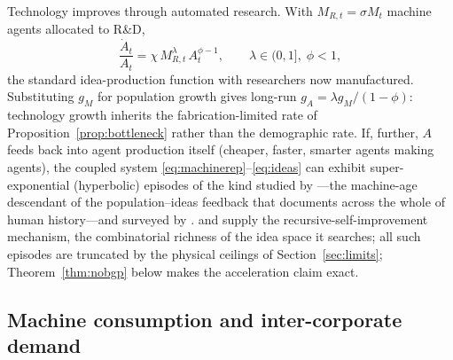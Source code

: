 \documentclass[11pt]{article}
\begin{document}
Technology improves through automated research. With $M_{R,t} = \sigma M_t$ machine agents allocated to R\&D,
\begin{equation}
\frac{\dot A_t}{A_t} = \chi\, M_{R,t}^{\lambda}\, A_t^{\phi-1},
\qquad \lambda \in (0,1],\; \phi < 1,
\label{eq:ideas}
\end{equation}
the standard idea-production function \citep{jones1995} with researchers now manufactured. Substituting $g_M$ for population growth gives long-run $g_A = \lambda g_M/(1-\phi)$: technology growth inherits the fabrication-limited rate of Proposition~\ref{prop:bottleneck} rather than the demographic rate. If, further, $A$ feeds back into agent production itself (cheaper, faster, smarter agents making agents), the coupled system \eqref{eq:machinerep}--\eqref{eq:ideas} can exhibit super-exponential (hyperbolic) episodes of the kind studied by \citet{roodman2020}---the machine-age descendant of the population--ideas feedback that \citet{kremer1993} documents across the whole of human history---and surveyed by \citet{erdil2023}. \citet{good1966} and \citet{bostrom2014} supply the recursive-self-improvement mechanism, \citet{weitzman1998} the combinatorial richness of the idea space it searches; all such episodes are truncated by the physical ceilings of Section~\ref{sec:limits}; Theorem~\ref{thm:nobgp} below makes the acceleration claim exact.

\subsection{Machine consumption and inter-corporate demand}\label{sec:machinedemand}
\end{document}
